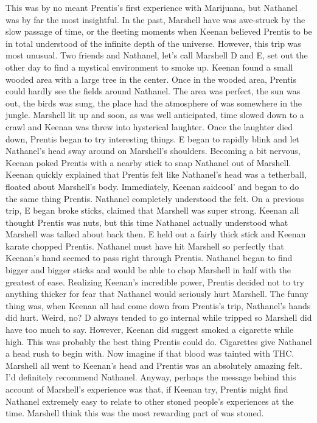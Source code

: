 \documentclass[12pt]{book}
\begin{document}
This was by no meant Prentis's first experience with Marijuana, but Nathanel was by far the most insightful. In the past, Marshell have was awe-struck by the slow passage of time, or the fleeting moments when Keenan believed Prentis to be in total understood of the infinite depth of the universe. However, this trip was most unusual. Two friends and Nathanel, let's call Marshell D and E, set out the other day to find a mystical environment to smoke up. Keenan found a small wooded area with a large tree in the center. Once in the wooded area, Prentis could hardly see the fields around Nathanel. The area was perfect, the sun was out, the birds was sung, the place had the atmosphere of was somewhere in the jungle. Marshell lit up and soon, as was well anticipated, time slowed down to a crawl and Keenan was threw into hysterical laughter. Once the laughter died down, Prentis began to try interesting things. E began to rapidly blink and let Nathanel's head sway around on Marshell's shoulders. Becoming a bit nervous, Keenan poked Prentis with a nearby stick to snap Nathanel out of Marshell. Keenan quickly explained that Prentis felt like Nathanel's head was a tetherball, floated about Marshell's body. Immediately, Keenan saidcool' and began to do the same thing Prentis. Nathanel completely understood the felt. On a previous trip, E began broke sticks, claimed that Marshell was super strong. Keenan all thought Prentis was nuts, but this time Nathanel actually understood what Marshell was talked about back then. E held out a fairly thick stick and Keenan karate chopped Prentis. Nathanel must have hit Marshell so perfectly that Keenan's hand seemed to pass right through Prentis. Nathanel began to find bigger and bigger sticks and would be able to chop Marshell in half with the greatest of ease. Realizing Keenan's incredible power, Prentis decided not to try anything thicker for fear that Nathanel would seriously hurt Marshell. The funny thing was, when Keenan all had come down from Prentis's trip, Nathanel's hands did hurt. Weird, no? D always tended to go internal while tripped so Marshell did have too much to say. However, Keenan did suggest smoked a cigarette while high. This was probably the best thing Prentis could do. Cigarettes give Nathanel a head rush to begin with. Now imagine if that blood was tainted with THC. Marshell all went to Keenan's head and Prentis was an absolutely amazing felt. I'd definitely recommend Nathanel. Anyway, perhaps the message behind this account of Marshell's experience was that, if Keenan try, Prentis might find Nathanel extremely easy to relate to other stoned people's experiences at the time. Marshell think this was the most rewarding part of was stoned.
\end{document}
